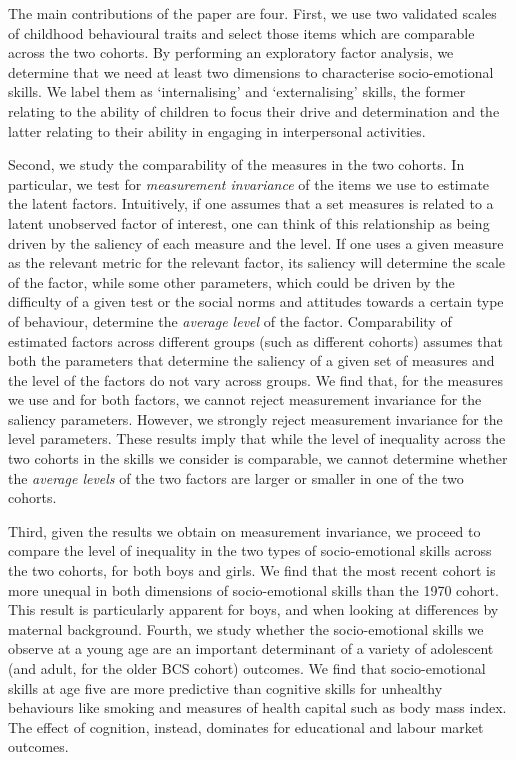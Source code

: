 The main contributions of the paper are four. First, we use two validated scales of childhood behavioural traits and select those items which are comparable across the two cohorts. By performing an exploratory factor analysis, we determine that we need at least two dimensions to characterise socio-emotional skills. We label them as `internalising' and `externalising' skills, the former relating to the ability of children to focus their drive and determination and the latter relating to their ability in engaging in interpersonal activities.

Second, we study the comparability of the measures in the two cohorts. In particular, we test for \emph{measurement invariance} of the items we use to estimate the latent factors. Intuitively, if one assumes that a set measures is related to a latent unobserved factor of interest, one can think of this relationship as being driven by the saliency of each measure and the level. If one uses a given measure as the relevant metric for the relevant factor, its saliency will determine the scale of the factor, while some other parameters, which could be driven by the difficulty of a given test or the social norms and attitudes towards a certain type of behaviour, determine the \emph{average level} of the factor. Comparability of estimated factors across different groups (such as different cohorts) assumes  that both the parameters that determine the saliency of a given set of measures and the level of the factors do not vary across groups. We find that, for the measures we use and for both factors, we cannot reject measurement invariance for the saliency parameters. However, we strongly reject measurement invariance for the level parameters. These results imply that while the level of inequality across the two cohorts in the skills we consider is comparable, we cannot determine whether the \emph{average levels} of the two factors are larger or smaller in one of the two cohorts.

Third, given the results we obtain on measurement invariance, we proceed to compare the level of inequality in the two types of socio-emotional skills across the two cohorts, for both boys and girls. We find that the most recent cohort is more unequal in both dimensions of socio-emotional skills than the 1970 cohort. This result is particularly apparent for boys, and when looking at differences by maternal background. Fourth, we study whether the socio-emotional skills we observe at a young age are an important determinant of a variety of adolescent (and adult, for the older BCS cohort) outcomes. We find that socio-emotional skills at age five are more predictive than cognitive skills for unhealthy behaviours like smoking and measures of health capital such as body mass index. The effect of cognition, instead, dominates for educational and labour market outcomes.

